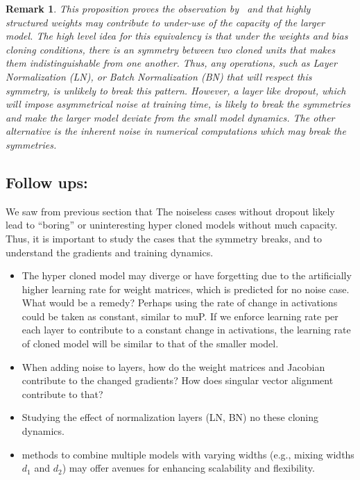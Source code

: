 \documentclass{article}
\newtheorem{remark}{Remark}
\newcommand{\1}{\mathbf{1}}
\begin{document}
\begin{remark}\label{cloning_symmetry}
    This proposition proves the observation by~\citet{samragh2024scaling} and \cite{wang2023lemon} that highly structured weights may contribute to under-use of the capacity of the larger model. The high level idea for this equivalency is that under the weights and bias cloning conditions, there is an symmetry between two cloned units that makes them indistinguishable from one another.  Thus, any operations, such as Layer Normalization (LN), or Batch Normalization (BN) that will respect this symmetry, is unlikely to break this pattern. However, a layer like dropout, which will impose asymmetrical noise at training time, is likely to break the symmetries and make the larger model deviate from the small model dynamics. The other alternative is the inherent noise in numerical computations which may break the symmetries. 
\end{remark} 



\subsection{Follow ups:}
We saw from previous section that The noiseless cases without dropout likely lead to ``boring'' or uninteresting hyper cloned models without much capacity. Thus, it is important to study the cases that the symmetry breaks, and to understand the gradients and training dynamics. 

\begin{itemize}
    \item The hyper cloned model may diverge or have forgetting due to the artificially higher learning rate for weight matrices, which is predicted for no noise case. What would be a remedy? Perhaps using the rate of change in activations could be taken as constant, similar to muP. If we enforce learning rate per each layer to contribute to a constant change in activations, the learning rate of cloned model will be similar to that of the smaller model. 
    \item When adding noise to layers, how do the weight matrices and Jacobian contribute to the changed gradients? How does singular vector alignment contribute to that?
    \item Studying the effect of normalization layers (LN, BN) no these cloning dynamics. 
    \item methods to combine multiple models with varying widths (e.g., mixing widths $d_1$ and $d_2$) may offer avenues for enhancing scalability and flexibility.
\end{itemize}
\end{document}
